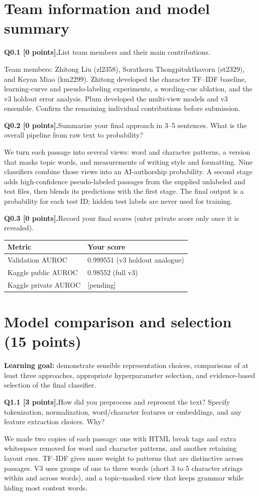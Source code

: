 \documentclass[11pt,letterpaper]{article}
\newcommand{\question}[2]{\needspace{4\baselineskip}\par\addvspace{0.45em}\noindent\textbf{#1}\quad #2\par\nobreak\vspace{0.1em}}
\begin{document}
\section{Team information and model summary}
\question{Q0.1 [0 points].}{List team members and their main contributions.}
Team members: Zhitong Liu (zl2358), Sorathorn Thongpitukthavorn (st2329), and Keyan Miao (km2299). Zhitong developed the character TF--IDF baseline, learning-curve and pseudo-labeling experiments, a wording-cue ablation, and the v3 holdout error analysis. Plum developed the multi-view models and v3 ensemble. Confirm the remaining individual contributions before submission.
\question{Q0.2 [0 points].}{Summarize your final approach in 3--5 sentences. What is the overall pipeline from raw text to probability?}
We turn each passage into several views: word and character patterns, a version that masks topic words, and measurements of writing style and formatting. Nine classifiers combine those views into an AI-authorship probability. A second stage adds high-confidence pseudo-labeled passages from the supplied unlabeled and test files, then blends its predictions with the first stage. The final output is a probability for each test ID; hidden test labels are never used for training.
\question{Q0.3 [0 points].}{Record your final scores (enter private score only once it is revealed).}
\begin{tabularx}{\linewidth}{@{}Yp{1.8in}@{}}\toprule Metric & Your score \\ \midrule Validation AUROC & 0.999551 (v3 holdout analogue) \\ Kaggle public AUROC & 0.98552 (full v3) \\ Kaggle private AUROC & [pending] \\ \bottomrule\end{tabularx}
\newpage
\section{Model comparison and selection (15 points)}
\textbf{Learning goal:} demonstrate sensible representation choices, comparisons of at least three approaches, appropriate hyperparameter selection, and evidence-based selection of the final classifier.

\question{Q1.1 [3 points].}{How did you preprocess and represent the text? Specify tokenization, normalization, word/character features or embeddings, and any feature extraction choices. Why?}
We made two copies of each passage: one with HTML break tags and extra whitespace removed for word and character patterns, and another retaining layout cues. TF--IDF gives more weight to patterns that are distinctive across passages. V3 uses groups of one to three words (short 3 to 5 character strings within and across words), and a topic-masked view that keeps grammar while hiding most content words. 
\newline
\end{document}

